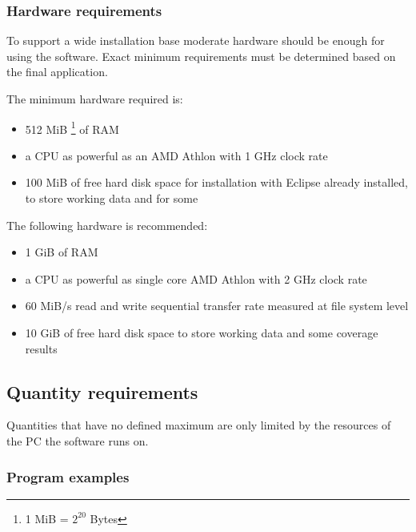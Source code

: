 \subsubsection{Hardware requirements} \label{nf:Hardware requirements}
To support a wide installation base moderate hardware should be enough for using the software. Exact minimum requirements must be determined based on the final application.
\par
The minimum hardware required is:
\begin{itemize}
\item 512 MiB \footnote{1 MiB = $2^{20}$ Bytes} of RAM
\item a CPU as powerful as an AMD Athlon with 1 GHz clock rate
\item 100 MiB of free hard disk space for installation with Eclipse already installed, to store working data and for some 
\end{itemize}

The following hardware is recommended:
\begin{itemize}
\item 1 GiB of RAM
\item a CPU as powerful as single core AMD Athlon with 2 GHz clock rate
\item 60 MiB/s read and write sequential transfer rate measured at file system level
\item 10 GiB of free hard disk space to store working data and some coverage results
\end{itemize}

\subsection{Quantity requirements} \label{nf:Quantity requirements}
Quantities that have no defined maximum are only limited by the resources of the PC the software runs on.

\subsubsection{Program examples}
